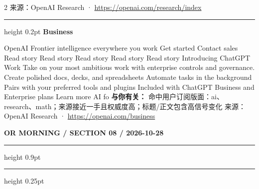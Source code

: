 \documentclass[10.5pt]{ctexart}
\begin{document}
\begin{multicols}{2}
{\footnotesize\color{ormuted} 来源：OpenAI Research · \url{https://openai.com/research/index}}
\vspace{2mm}
\hrule height 0.2pt
\vspace{2mm}
{\large\bfseries Business}\par
OpenAI Frontier intelligence everywhere you work Get started Contact sales Read story Read story Read story Read story Read story Introducing ChatGPT Work Take on your most ambitious work with enterprise controls and governance. Create polished docs, decks, and spreadsheets Automate tasks in the background Pairs with your preferred tools and plugins Included with ChatGPT Business and Enterprise plans Learn more AI fo
\textbf{与你有关：} 命中用户订阅版面：ai、research、math；来源接近一手且权威度高；标题/正文包含高信号变化
{\footnotesize\color{ormuted} 来源：OpenAI Research · \url{https://openai.com/business}}
\end{multicols}
\newpage
{\small\bfseries OR MORNING / SECTION 08 / 2026-10-28}
\vspace{2mm}
\hrule height 0.9pt
\vspace{1.5mm}
\hrule height 0.25pt
\vspace{4mm}
\end{document}

